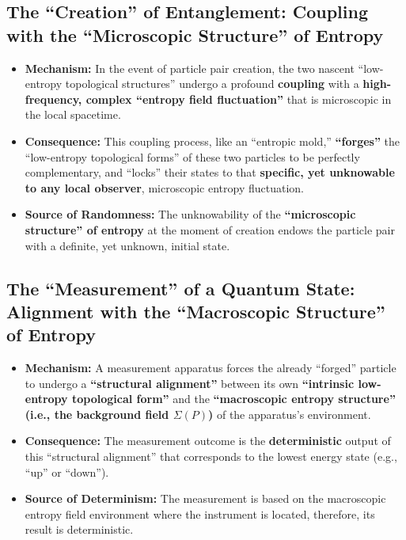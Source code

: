 \documentclass[11pt]{article}
\begin{document}
\subsection{The ``Creation'' of Entanglement: Coupling with the ``Microscopic Structure'' of Entropy}
\begin{itemize}
    \item   \textbf{Mechanism:} In the event of particle pair creation, the two nascent ``low-entropy topological structures'' undergo a profound \textbf{coupling} with a \textbf{high-frequency, complex ``entropy field fluctuation''} that is microscopic in the local spacetime.
    \item   \textbf{Consequence:} This coupling process, like an ``entropic mold,'' \textbf{``forges''} the ``low-entropy topological forms'' of these two particles to be perfectly complementary, and ``locks'' their states to that \textbf{specific, yet unknowable to any local observer}, microscopic entropy fluctuation.
    \item   \textbf{Source of Randomness:} The unknowability of the \textbf{``microscopic structure'' of entropy} at the moment of creation endows the particle pair with a definite, yet unknown, initial state.
\end{itemize}

\subsection{The ``Measurement'' of a Quantum State: Alignment with the ``Macroscopic Structure'' of Entropy}
\begin{itemize}
    \item   \textbf{Mechanism:} A measurement apparatus forces the already ``forged'' particle to undergo a \textbf{``structural alignment''} between its own \textbf{``intrinsic low-entropy topological form''} and the \textbf{``macroscopic entropy structure'' (i.e., the background field $\Sigma(P)$)} of the apparatus's environment.
    \item   \textbf{Consequence:} The measurement outcome is the \textbf{deterministic} output of this ``structural alignment'' that corresponds to the lowest energy state (e.g., ``up'' or ``down'').
    \item   \textbf{Source of Determinism:} The measurement is based on the macroscopic entropy field environment where the instrument is located, therefore, its result is deterministic.
\end{itemize}
\end{document}
